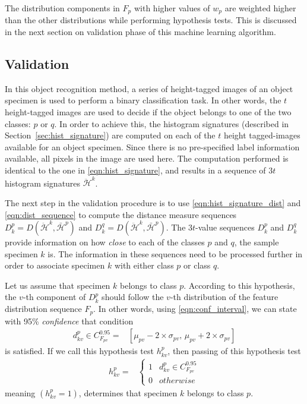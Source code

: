 The distribution components in $F_p$ with higher values of $w_p$ are weighted higher than the other distributions while performing hypothesis tests. This is discussed in the next section on validation phase of this machine learning algorithm.

\subsection{Validation}
\label{sec:distdes_validation}


In this object recognition method, a series of height-tagged images of an object specimen is used to perform a binary classification task. In other words, the $t$ height-tagged images are used to decide if the object belongs to one of the two classes: $p$ or $q$. In order to achieve this, the histogram signatures (described in Section~\ref{sec:hist_signature}) are computed on each of the $t$ height tagged-images available for an object specimen. Since there is no pre-specified label information available, all pixels in the image are used here. The computation performed is identical to the one in \eqref{eqn:hist_signature}, and results in a sequence of $3t$ histogram signatures $\ddot{\mathcal{H}}^{k}$. 

The next step in the validation procedure is to use \eqref{eqn:hist_signature_dist} and \eqref{eqn:dist_sequence} to compute the distance measure sequences $D^p_k=D(\ddot{\mathcal{H}}^{k}, \bar{\mathcal{H}}^{p})$ and $D^q_k=D(\ddot{\mathcal{H}}^{k}, \bar{\mathcal{H}}^{p})$. The $3t$-value sequences $D^p_k$ and $D^q_k$ provide information on how \emph{close} to each of the classes $p$ and $q$, the sample specimen $k$ is. The information in these sequences need to be processed further in order to associate specimen $k$ with either class $p$ or class $q$.

Let us assume that specimen $k$ belongs to class $p$. According to this hypothesis, the $v$-th component of $D^p_k$ should follow the $v$-th distribution of the feature distribution sequence $F_p$. In other words, using \eqref{eqn:conf_interval}, we can state with 95\% \textit{confidence} that condition 
%
\begin{align}
  d^p_{kv} \in C^{0.95}_{F_{pv}}= &[\mu_{pv}-2 \times \sigma_{pv},\, \mu_{pv}+2 \times \sigma_{pv}]
  \label{eqn:conf_interval_validation}
\end{align}
%
is satisfied. If we call this hypothesis test $h^p_{kv}$, then passing of this hypothesis test
%
\begin{align}
 h^p_{kv} = &
 \begin{cases}
    1	&	d^p_{kv} \in C^{0.95}_{F_{pv}}\\
    0	&	otherwise
 \end{cases} \label{eqn:hypothesis_test}
\end{align}
%
meaning $(h^p_{kv}=1)$, determines that specimen $k$ belongs to class $p$.


